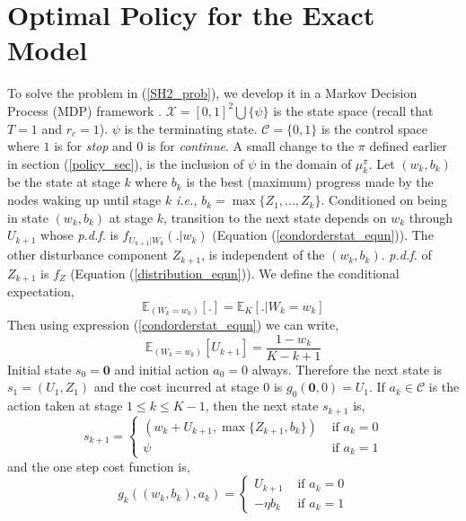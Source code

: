 \documentclass[onecolumn]{IEEEtran}
\begin{document}
\section{Optimal Policy for the Exact Model}
\label{optimal_policy}
To solve the problem in (\ref{SH2_prob}), we develop it in a Markov
Decision Process (MDP) framework \cite{optimalcontrol}.
$\mathcal{X}=[0,1]^2\bigcup\{\psi\}$ is the state space (recall that
$T=1$ and $r_c=1$).  $\psi$ is the terminating state.
$\mathcal{C}=\{0,1\}$ is the control space where $1$ is for
\emph{stop} and $0$ is for \emph{continue}. A small change to the
$\pi$ defined earlier in section (\ref{policy_sec}), is the inclusion
of $\psi$ in the domain of $\mu^{\pi}_k$. Let $(w_k,b_k)$ be the
state at stage $k$ where $b_k$ is the best (maximum) progress made by
the nodes waking up until stage $k$ \emph{i.e.,}
$b_k=\max\{Z_{1},...,Z_{k}\}$. Conditioned on being in state
$(w_k,b_k)$ at stage $k$, transition to the next state depends on
$w_k$ through ${U}_{k+1}$ whose \emph{p.d.f.} is $f_{U_{k+1}|W_{k}}(.|w_{k})$
(Equation (\ref{condorderstat_equn})). The other disturbance component
$Z_{{k+1}}$, is independent of the $(w_k,b_k)$. \emph{p.d.f.} of $Z_{k+1}$ is
$f_{Z}$ (Equation (\ref{distribution_equn})). We define the
conditional expectation,
\begin{equation*}
 \mathbb{E}_{(W_k=w_k)}[.]=\mathbb{E}_K[.|W_k=w_k]
\end{equation*}
\noindent
Then using expression (\ref{condorderstat_equn}) we can write,
\begin{equation}
\mathbb{E}_{(W_k=w_k)}[U_{k+1}]=\frac{1-w_k}{K-k+1}
\end{equation}
\noindent
Initial state $s_0=\textbf{0}$ and initial action $a_0=0$ always.
Therefore the next state is $s_1=(U_1,Z_1)$ and the cost incurred at
stage $0$ is $g_0(\textbf{0},0)=U_1$.  If $a_k\in\mathcal{C}$ is the
action taken at stage $1\le k\le K-1$, then the next state $s_{k+1}$
is,
\begin{equation*}
s_{k+1}=\left\{ \begin{array}{ll}
                 (w_{k}+{U}_{k+1},\max\{Z_{{k+1}},b_k\})&\mbox{  if  } a_k=0\\
                \psi&\mbox{   if  } a_k=1\end{array} \right.
\end{equation*}
and the one step  cost  function is,
\begin{equation}
\label{extcostfunc_equn}
g_k((w_k,b_k),a_k)=\left\{\begin{array}{ll}
                    {U}_{k+1}&\mbox{ if }a_k=0 \\
                    -\eta b_k&\mbox{ if }a_k=1\end{array} \right.
\end{equation}
\end{document}
